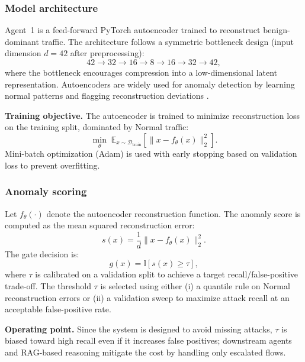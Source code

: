 \documentclass[conference]{IEEEtran}
\begin{document}
\subsubsection{Model architecture}
Agent~1 is a feed-forward PyTorch autoencoder trained to reconstruct benign-dominant traffic. The architecture follows a symmetric bottleneck design (input dimension $d=42$ after preprocessing):
\begin{equation}
42 \rightarrow 32 \rightarrow 16 \rightarrow 8 \rightarrow 16 \rightarrow 32 \rightarrow 42,
\end{equation}
where the bottleneck encourages compression into a low-dimensional latent representation. Autoencoders are widely used for anomaly detection by learning normal patterns and flagging reconstruction deviations \cite{Hinton2006Reducing,Mirsky2018Kitsune}.

\textbf{Training objective.} The autoencoder is trained to minimize reconstruction loss on the training split, dominated by Normal traffic:
\begin{equation}
 \min_\theta\; \mathbb{E}_{x\sim\mathcal{D}_{\text{train}}}\left[\lVert x - f_\theta(x)\rVert_2^2\right].
\end{equation}
Mini-batch optimization (Adam) is used with early stopping based on validation loss to prevent overfitting.

\subsubsection{Anomaly scoring}
Let $f_\theta(\cdot)$ denote the autoencoder reconstruction function. The anomaly score is computed as the mean squared reconstruction error:
\begin{equation}
 s(x) = \frac{1}{d}\lVert x - f_\theta(x) \rVert_2^2.
\end{equation}
The gate decision is:
\begin{equation}
 g(x) = \mathbb{I}[s(x) \ge \tau],
\end{equation}
where $\tau$ is calibrated on a validation split to achieve a target recall/false-positive trade-off. The threshold $\tau$ is selected using either (i) a quantile rule on Normal reconstruction errors or (ii) a validation sweep to maximize attack recall at an acceptable false-positive rate.

\textbf{Operating point.} Since the system is designed to avoid missing attacks, $\tau$ is biased toward high recall even if it increases false positives; downstream agents and RAG-based reasoning mitigate the cost by handling only escalated flows.
\end{document}
